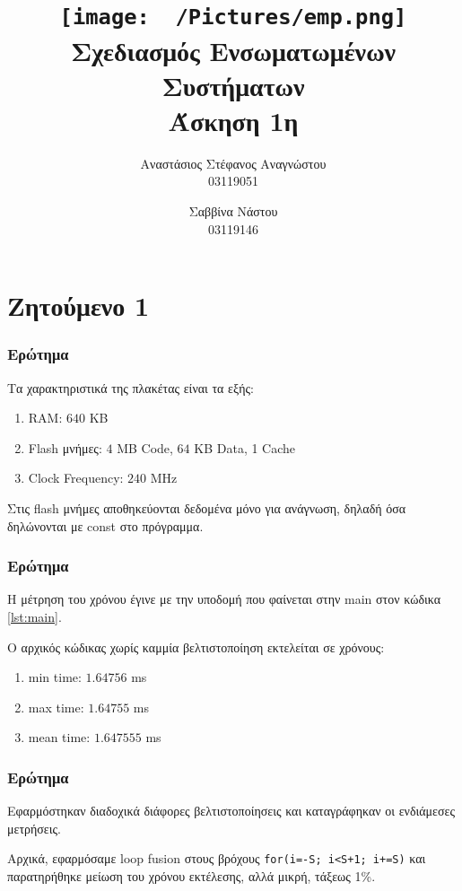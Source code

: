 \documentclass{article}
\title{
    \texttt{[image: ~/Pictures/emp.png]} \\
    \vskip 5cm
    Σχεδιασμός Ενσωματωμένων Συστήματων \\
    \large Άσκηση 1η
    \vskip 5cm
}
\author{
    Αναστάσιος Στέφανος Αναγνώστου \\ \large 03119051 \and
    Σαββίνα Νάστου \\ \large 03119146
}
\newcommand{\eng}[1]{\foreignlanguage{english}{#1}} %
\begin{document}
\maketitle \clearpage \tableofcontents \clearpage

\part{Ζητούμενο 1}

\section{Ερώτημα}

Τα χαρακτηριστικά της πλακέτας είναι τα εξής:

\begin{enumerate}
    \item \eng{RAM}: $640$ \eng{KB}
    \item \eng{Flash} μνήμες: $4$ \eng{MB Code}, $64$ \eng{KB Data}, \eng{1 Cache}
    \item \eng{Clock Frequency: $240$ MHz}
\end{enumerate}

Στις \eng{flash} μνήμες αποθηκεύονται δεδομένα μόνο για ανάγνωση, δηλαδή όσα δηλώνονται
με \eng{const} στο πρόγραμμα.

\section{Ερώτημα}

Η μέτρηση του χρόνου έγινε με την υποδομή που φαίνεται στην \eng{main}
στον κώδικα \ref{lst:main}.

Ο αρχικός κώδικας χωρίς καμμία βελτιστοποίηση εκτελείται σε χρόνους:

\begin{enumerate}
    \item \eng{min time: $1.64756$ ms}
    \item \eng{max time: $1.64755$ ms}
    \item \eng{mean time: $1.647555$ ms}
\end{enumerate}

\section{Ερώτημα}

Εφαρμόστηκαν διαδοχικά διάφορες βελτιστοποίησεις και καταγράφηκαν οι
ενδιάμεσες μετρήσεις.

Αρχικά, εφαρμόσαμε \eng{loop fusion} στους βρόχους \texttt{\eng{for(i=-S; i<S+1; i+=S)}}
και παρατηρήθηκε μείωση του χρόνου εκτέλεσης, αλλά μικρή, τάξεως 1\%.
\end{document}
